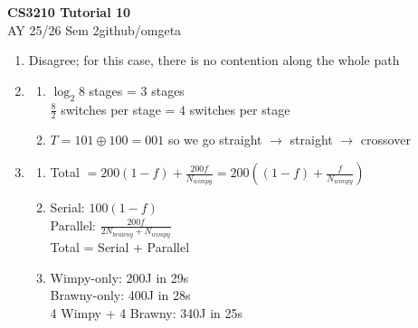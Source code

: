 \documentclass[12pt, a4paper]{article}
\newcommand{\mytitle}{CS3210 Tutorial 10}
\newcommand{\myauthor}{github/omgeta}
\newcommand{\mydate}{AY 25/26 Sem 2}
\begin{document}
\raggedright
\normalsize
\begin{center}
{\normalsize{\textbf{\mytitle}}} \\
{\footnotesize{\mydate\hspace{2pt}\textemdash\hspace{2pt}\myauthor}}
\end{center}
\begin{enumerate}
  \item Disagree; for this case, there is no contention along the whole path

  \item 
    \begin{enumerate}
      \item $\log_2 8$ stages = $3$ stages\\ 
        $\frac{8}{2}$ switches per stage = $4$ switches per stage

      \item $T = 101 \oplus 100 = 001$ so we go straight $\rightarrow$ straight $\rightarrow$ crossover
    \end{enumerate}

  \item 
    \begin{enumerate}
      \item Total $= 200(1-f) + \frac{200f}{N_{wimpy}} = 200((1 -f) + \frac{f}{N_{wimpy}})$

      \item Serial: $100(1-f)$\\ 
        Parallel: $\frac{200f}{2N_{brawny} + N_{wimpy}}$\\ 
        Total = Serial + Parallel

      \item Wimpy-only: 200J in 29s \\ 
        Brawny-only: 400J in 28s \\ 
        4 Wimpy + 4 Brawny: 340J in 25s 
    \end{enumerate}
\end{enumerate}
\end{document}
